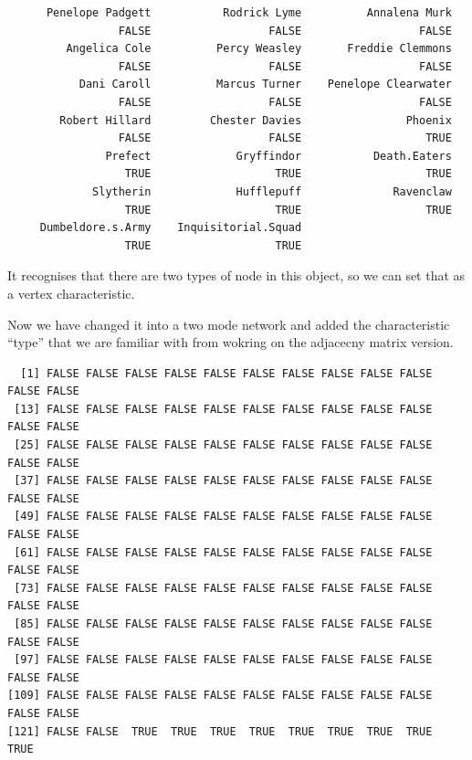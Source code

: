 \documentclass[
  letterpaper,
  DIV=11,
  numbers=noendperiod]{scrreprt}
\newenvironment{Shaded}{\begin{snugshade}}{\end{snugshade}}
\newcommand{\FunctionTok}[1]{\textcolor[rgb]{0.28,0.35,0.67}{#1}}
\newcommand{\NormalTok}[1]{\textcolor[rgb]{0.00,0.23,0.31}{#1}}
\newcommand{\OtherTok}[1]{\textcolor[rgb]{0.00,0.23,0.31}{#1}}
\newcommand{\SpecialCharTok}[1]{\textcolor[rgb]{0.37,0.37,0.37}{#1}}
\begin{document}
\begin{verbatim}
      Penelope Padgett           Rodrick Lyme          Annalena Murk 
                 FALSE                  FALSE                  FALSE 
         Angelica Cole          Percy Weasley       Freddie Clemmons 
                 FALSE                  FALSE                  FALSE 
           Dani Caroll          Marcus Turner    Penelope Clearwater 
                 FALSE                  FALSE                  FALSE 
        Robert Hillard         Chester Davies                Phoenix 
                 FALSE                  FALSE                   TRUE 
               Prefect             Gryffindor           Death.Eaters 
                  TRUE                   TRUE                   TRUE 
             Slytherin             Hufflepuff              Ravenclaw 
                  TRUE                   TRUE                   TRUE 
     Dumbeldore.s.Army    Inquisitorial.Squad 
                  TRUE                   TRUE 
\end{verbatim}

It recognises that there are two types of node in this object, so we can
set that as a vertex characteristic.

\begin{Shaded}
\end{Shaded}

Now we have changed it into a two mode network and added the
characteristic ``type'' that we are familiar with from wokring on the
adjacecny matrix version.

\begin{Shaded}
\end{Shaded}

\begin{verbatim}
  [1] FALSE FALSE FALSE FALSE FALSE FALSE FALSE FALSE FALSE FALSE FALSE FALSE
 [13] FALSE FALSE FALSE FALSE FALSE FALSE FALSE FALSE FALSE FALSE FALSE FALSE
 [25] FALSE FALSE FALSE FALSE FALSE FALSE FALSE FALSE FALSE FALSE FALSE FALSE
 [37] FALSE FALSE FALSE FALSE FALSE FALSE FALSE FALSE FALSE FALSE FALSE FALSE
 [49] FALSE FALSE FALSE FALSE FALSE FALSE FALSE FALSE FALSE FALSE FALSE FALSE
 [61] FALSE FALSE FALSE FALSE FALSE FALSE FALSE FALSE FALSE FALSE FALSE FALSE
 [73] FALSE FALSE FALSE FALSE FALSE FALSE FALSE FALSE FALSE FALSE FALSE FALSE
 [85] FALSE FALSE FALSE FALSE FALSE FALSE FALSE FALSE FALSE FALSE FALSE FALSE
 [97] FALSE FALSE FALSE FALSE FALSE FALSE FALSE FALSE FALSE FALSE FALSE FALSE
[109] FALSE FALSE FALSE FALSE FALSE FALSE FALSE FALSE FALSE FALSE FALSE FALSE
[121] FALSE FALSE  TRUE  TRUE  TRUE  TRUE  TRUE  TRUE  TRUE  TRUE  TRUE
\end{verbatim}
\end{document}
